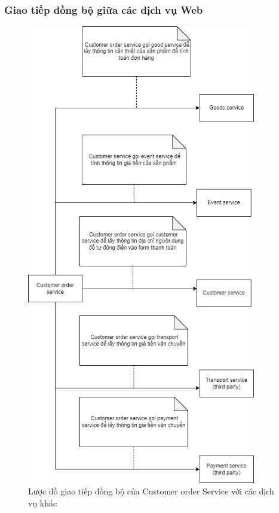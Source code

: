 \newpage
\subsubsection{Giao tiếp đồng bộ giữa các dịch vụ Web}

\begin{figure}[!htp]
	\centering
	\includegraphics[width=10cm]{img/Architecture/service/customer-order-call.png}
	\newline
	\caption{Lược đồ giao tiếp đồng bộ của Customer order Service với các dịch vụ khác}
\end{figure}

